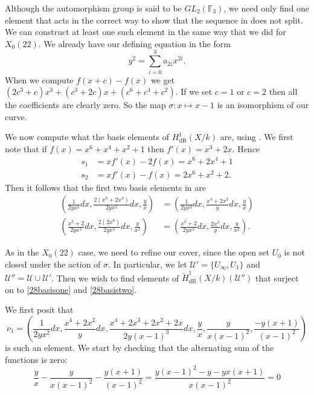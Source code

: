 \documentclass[draft, 11pt]{article} %
\theoremstyle{plain}
\theoremstyle{remark}
\newcommand{\cU}{{\mathcal U}}
\newcommand{\derhamhone}{H_{\text {dR}}^1(X/k)}
\newcommand{\cechderhamhone}{\check{H}_{\text {dR}}^1(X/k)}
\begin{document}
Although the automorphism group is said to be $GL_2(\mathbb F_3)$, we need only find one element that acts in the correct way to show that the sequence in \cite{derhamactions} does not split.
We can construct at least one such element in the same way that we did for $X_0(22)$.
We already have our defining equation in the form
\[
y^2 = \sum_{i=0}^3 a_{2i}x^{2i}.
\]
When we compute $f(x+c) - f(x)$ we get $(2c^3+c)x^3 + (c^3 + 2c)x + (c^6 + c^4 + c^2)$.
If we set $c=1$ or $c=2$ then all the coefficients are clearly zero.
So the map $\sigma \colon x \mapsto x-1$ is an isomorphism of our curve.

We now compute what the basis elements of $\derhamhone$ are, using \cite[Thm. 2.3]{derhamactions}.
We first note that if $f(x) = x^6 + x^4 + x^2 +1$ then $f'(x) = x^3 + 2x$.
Hence
\begin{align}
s_1 & = xf'(x) -2f(x) = x^6 + 2x^4 + 1 \\
s_2 & = xf'(x) - f(x) = 2x^6 + x^2 + 2.
\end{align}
Then it follows that the first two basis elements in \cite[Thm. 2.3]{derhamactions} are
\begin{align}
\left( \frac{1}{2yx^2}dx, \frac{2(x^6 + 2x^4)}{2yx^2}dx, \frac{y}{x} \right) & = \left( \frac{1}{2yx^2}dx, \frac{x^4+2x^2}{y}dx, \frac{y}{x} \right) \label{28basisone} \\
\left( \frac{x^2 + 2}{2yx^3}dx, \frac{2(2x^6)}{2yx^3}dx, \frac{y}{x^2} \right) & = \left( \frac{x^2 + 2}{2yx^3}dx, \frac{2x^3}{y}dx, \frac{y}{x^2} \right). \label{28basistwo}
\end{align}

As in the $X_0(22)$ case, we need to refine our cover, since the open set $U_0$ is not closed under the action of $\sigma$.
In particular, we let $\cU' = \{U_\infty, U_{1} \}$ and $\cU'' = \cU \cup \cU'$.
Then we wish to find elements of $\cechderhamhone(\cU'')$ that surject on to \eqref{28basisone} and \eqref{28basistwo}.

We first posit that
\[
\nu_1 = \left( \frac{1}{2yx^2}dx, \frac{x^4+2x^2}{y}dx, \frac{x^4 + 2x^3 + 2x^2 + 2x}{2y(x-1)^3}dx, \frac{y}{x}, \frac{y}{x(x-1)^2}, \frac{-y(x+1)}{(x-1)^2} \right)
\]
is such an element.
We start by checking that the alternating sum of the functions is zero:
\begin{equation*}
\frac{y}{x} - \frac{y}{x(x-1)^2} - \frac{y(x+1)}{(x-1)^2}  = \frac{y(x-1)^2 - y - yx(x+1)}{x(x-1)^2} = 0
\end{equation*}
\end{document}
